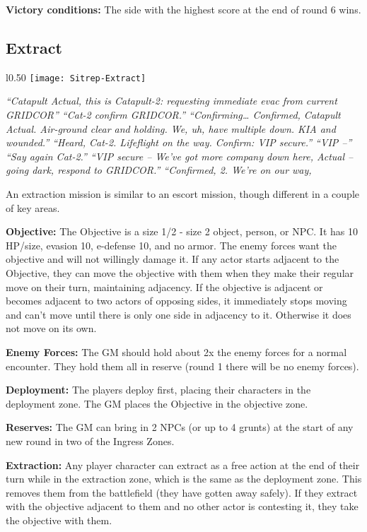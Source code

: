 \textbf{Victory conditions:} The side with the highest score at the end of round 6 wins.

\subsection{Extract}

\begin{wrapfigure}{l}{0.50\textwidth}
  \centering
  \texttt{[image: Sitrep-Extract]}
\end{wrapfigure}
\textit{“Catapult Actual, this is Catapult-2: requesting immediate evac from current GRIDCOR” “Cat-2 confirm GRIDCOR.” “Confirming… Confirmed, Catapult Actual. Air-ground clear and holding. We, uh, have multiple down. KIA and wounded.” “Heard, Cat-2. Lifeflight on the way. Confirm: VIP secure.” “VIP --” “Say again Cat-2.” “VIP secure -- We’ve got more company down here, Actual -- going dark, respond to GRIDCOR.” “Confirmed, 2. We’re on our way,}

An extraction mission is similar to an escort mission, though different in a couple of key areas.

\textbf{Objective:} The Objective is a size 1/2 - size 2 object, person, or NPC. It has 10 HP/size, evasion 10, e-defense 10, and no armor. The enemy forces want the objective and will not willingly damage it. If any actor starts adjacent to the Objective, they can move the objective with them when they make their regular move on their turn, maintaining adjacency. If the objective is adjacent or becomes adjacent to two actors of opposing sides, it immediately stops moving and can’t move until there is only one side in adjacency to it. Otherwise it does not move on its own.

\textbf{Enemy Forces:} The GM should hold about 2x the enemy forces for a normal encounter. They hold them all in reserve (round 1 there will be no enemy forces).

\textbf{Deployment:} The players deploy first, placing their characters in the deployment zone. The GM places the Objective in the objective zone.

\textbf{Reserves:} The GM can bring in 2 NPCs (or up to 4 grunts) at the start of any new round in two of the Ingress Zones.

\textbf{Extraction:} Any player character can extract as a free action at the end of their turn while in the extraction zone, which is the same as the deployment zone. This removes them from the battlefield (they have gotten away safely). If they extract with the objective adjacent to them and no other actor is contesting it, they take the objective with them.

